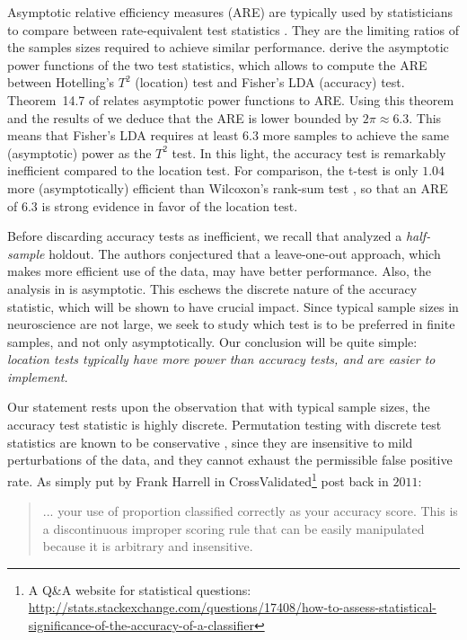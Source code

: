 \documentclass[12pt,a4paper]{article}
\begin{document}
Asymptotic relative efficiency measures (ARE) are typically used by statisticians to compare between rate-equivalent test statistics \citep{vaart_asymptotic_1998}.
They are the limiting ratios of the samples sizes required to achieve similar performance. 
\cite{ramdas_classification_2016} derive the asymptotic power functions of the two test statistics, which allows to compute the ARE between Hotelling's $T^2$ (location) test and Fisher's LDA (accuracy) test.
Theorem~14.7 of \cite{vaart_asymptotic_1998} relates asymptotic power functions to ARE.
Using this theorem and the results of \cite{ramdas_classification_2016} we deduce that the ARE is lower bounded by $2 \pi \approx 6.3$. 
This means that Fisher's LDA requires at least $6.3$ more samples to achieve the same (asymptotic) power as the $T^2$ test. 
In this light, the accuracy test is remarkably inefficient compared to the location test.  
For comparison, the t-test is only $1.04$ more (asymptotically) efficient than Wilcoxon's rank-sum test \citep{lehmann_parametric_2009}, so that an ARE of $6.3$ is strong evidence in favor of the location test. 

Before discarding accuracy tests as inefficient, we recall that \cite{ramdas_classification_2016} analyzed a \emph{half-sample} holdout. 
The authors conjectured that a leave-one-out approach, which makes more efficient use of the data, may have better performance. 
Also, the analysis in \cite{ramdas_classification_2016} is asymptotic. 
This eschews the discrete nature of the accuracy statistic, which will be shown to have  crucial impact. 
Since typical sample sizes in neuroscience are not large, we seek to study which test is to be preferred in finite samples, and not only asymptotically.
Our conclusion will be quite simple: {\em location tests typically have more power than accuracy tests, and are easier to implement.}

Our statement rests upon the observation that with typical sample sizes, the accuracy test statistic is highly discrete. 
Permutation testing with discrete test statistics are known to be conservative \citep{hemerik_exact_2014}, since they are insensitive to mild perturbations of the data, and they cannot exhaust the permissible false positive rate. 
As simply put by Frank Harrell in \textsf{CrossValidated\footnote{A Q\&A website for statistical questions: \url{http://stats.stackexchange.com/questions/17408/how-to-assess-statistical-significance-of-the-accuracy-of-a-classifier}}} post back in $2011$:
\begin{quote}
	... your use of proportion classified correctly as your accuracy score. This is a discontinuous improper scoring rule that can be easily manipulated because it is arbitrary and insensitive.
\end{quote}
\end{document}
